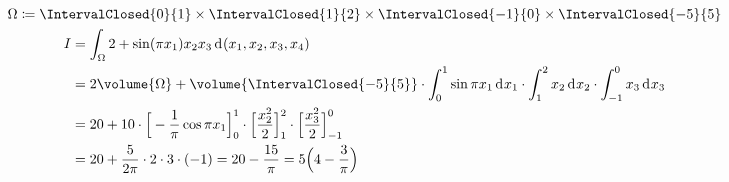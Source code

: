 \documentclass[../full]{subfiles}
\begin{document}

    \begin{gather*}
        \Omega
        \coloneqq \IntervalClosed{0}{1} \times \IntervalClosed{1}{2}
            \times \IntervalClosed{-1}{0} \times \IntervalClosed{-5}{5}
        \\
        \begin{aligned}
            I &= \int_\Omega
                    2 + \sin \paren{\pi x_1} x_2 x_3
                    \dx[\paren{x_1, x_2, x_3, x_4}]
            \\ &
            = 2 \volume{\Omega}
            + \volume{\IntervalClosed{-5}{5}}
                \cdot \int_0^1 \sin \pi x_1 \dx[x_1]
                \cdot \int_1^2 x_2 \dx[x_2]
                \cdot \int_{-1}^0 x_3 \dx[x_3]
            \\ &
            = 20
            + 10 \cdot \FunctionBounds{-\frac{1}{\pi} \cos \pi x_1}{0}{1}
                \cdot \FunctionBounds{\frac{x_2^2}{2}}{1}{2}
                \cdot \FunctionBounds{\frac{x_3^2}{2}}{-1}{0}
            \\ &
            = 20 + \frac{5}{2 \pi} \cdot 2 \cdot 3 \cdot \paren{-1}
            = 20 - \frac{15}{\pi}
            = 5 \paren[\Big]{4 - \frac{3}{\pi}}
        \end{aligned}
    \end{gather*}
\end{document}

